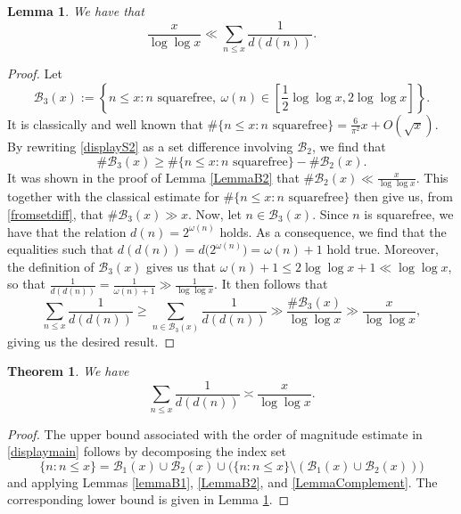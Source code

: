 \documentclass[12pt]{article}
\newtheorem{theorem}{Theorem}
\newtheorem{lemma}{Lemma}%
\begin{document}
\begin{lemma}\label{LemmaLower}
 We have that $$ \frac{x}{\log\log x} \ll \sum_{n\le x}\frac{1}{d(d(n))}. $$
\end{lemma}

\begin{proof}
Let
\begin{equation}\label{displayS2}
\mathcal{B}_{3}(x) := \left\{ n \le x : n \text{ squarefree},\ 
\omega(n) \in \left[\frac12\log\log x, 2\log\log x\right] \right\}.
\end{equation}
 It is classically and well known that $ \#\{n \le x : n \text{ squarefree}\} = \frac{6}{\pi^2}x + O(\sqrt{x})$. 
 By rewriting \eqref{displayS2} as a set difference involving $\mathcal{B}_{2}$, we find that
\begin{equation}\label{fromsetdiff}
 \#\mathcal{B}_{3}(x) \geq \#\{ n \leq x : \text{$n$ squarefree} \} 
 - \#\mathcal{B}_{2}(x). 
\end{equation}
 It was shown in the proof of Lemma \ref{LemmaB2} that $ \#\mathcal{B}_{2}(x) \ll \frac{x}{\log \log x}$. This together with the classical 
 estimate for $\#\{n \le x : n \text{ squarefree}\}$ then give us, from \eqref{fromsetdiff}, that $\#\mathcal{B}_{3}(x) \gg x$. Now, let 
 $n \in \mathcal{B}_{3}(x)$. Since \(n\) is squarefree, we have that the relation $ d(n) = 2^{\omega(n)}$ holds. As a consequence, we 
 find that the equalities such that $ d(d(n)) = d\big(2^{\omega(n)}\big)=\omega(n)+1 $ hold true. Moreover, the definition of 
 $\mathcal{B}_{3}(x)$ gives us that $ \omega(n)+1\leq 2\log\log x+1 \ll \log\log x$, so that $ \frac{1}{d(d(n))} = \frac{1}{\omega(n) + 
 1} \gg \frac{1}{\log\log x}$. It then follows that $$ \sum_{n \leq x} \frac{1}{d(d(n))} \geq \sum_{n\in\mathcal{B}_{3}(x)}\frac{1}{d(d(n))}
\gg \frac{\#\mathcal{B}_{3}(x)}{\log\log x} \gg
\frac{x}{\log\log x}, $$ giving us the desired result. 
\end{proof}

\begin{theorem}\label{MainTheorem}
We have
\begin{equation}\label{displaymain}
\sum_{n\le x}\frac{1}{d(d(n))}
\asymp
\frac{x}{\log\log x}.
\end{equation}
\end{theorem}

\begin{proof}
 The upper bound associated with the order of magnitude estimate in \eqref{displaymain} follows by decomposing the index set 
 $$ \{ n : n \leq x \} = \mathcal{B}_1(x) \cup \mathcal{B}_2(x) \cup \big( \{ n : n \leq x \} \setminus(\mathcal{B}_1(x) \cup 
 \mathcal{B}_2(x))\big) $$ and applying Lemmas \ref{lemmaB1}, \ref{LemmaB2}, 
 and \ref{LemmaComplement}. The corresponding lower bound is given in Lemma \ref{LemmaLower}.
\end{proof}
\end{document}
